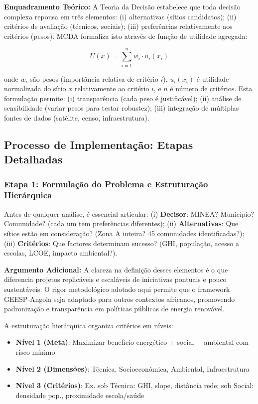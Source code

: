 \documentclass[12pt, a4paper]{article}
\begin{document}
\textbf{Enquadramento Teórico:} A Teoria da Decisão estabelece que toda decisão complexa repousa em três elementos: (i) alternativas (sítios candidatos); (ii) critérios de avaliação (técnicos, sociais); (iii) preferências relativamente aos critérios (pesos). MCDA formaliza isto através de função de utilidade agregada:

\begin{equation}
U(x) = \sum_{i=1}^{n} w_i \cdot u_i(x_i)
\end{equation}

onde $w_i$ são pesos (importância relativa de critério $i$), $u_i(x_i)$ é utilidade normalizada do sítio $x$ relativamente ao critério $i$, e $n$ é número de critérios. Esta formulação permite: (i) transparência (cada peso é justificável); (ii) análise de sensibilidade (variar pesos para testar robustez); (iii) integração de múltiplas fontes de dados (satélite, censo, infraestrutura).

\subsection{Processo de Implementação: Etapas Detalhadas}

\subsubsection{Etapa 1: Formulação do Problema e Estruturação Hierárquica}
Antes de qualquer análise, é essencial articular: (i) 
\textbf{Decisor}: MINEA? Município? Comunidade? (cada um tem preferências diferentes); (ii) 
\textbf{Alternativas}: Que sítios estão em consideração? (Zona A inteira? 45 comunidades identificadas?); (iii) 
\textbf{Critérios}: Que factores determinam sucesso? (GHI, população, acesso a escolas, LCOE, impacto ambiental?).

\textbf{Argumento Adicional:} A clareza na definição desses elementos é o que diferencia projetos replicáveis e escaláveis de iniciativas pontuais e pouco sustentáveis. O rigor metodológico adotado aqui permite que o framework GEESP-Angola seja adaptado para outros contextos africanos, promovendo padronização e transparência em políticas públicas de energia renovável.

A estruturação hierárquica organiza critérios em níveis:
\begin{itemize}
\item \textbf{Nível 1 (Meta)}: Maximizar benefício energético + social + ambiental com risco mínimo
\item \textbf{Nível 2 (Dimensões)}: Técnica, Socioeconómica, Ambiental, Infraestrutura
\item \textbf{Nível 3 (Critérios)}: Ex. sob Técnica: GHI, slope, distância rede; sob Social: densidade pop., proximidade escola/saúde
\end{itemize}
\end{document}
